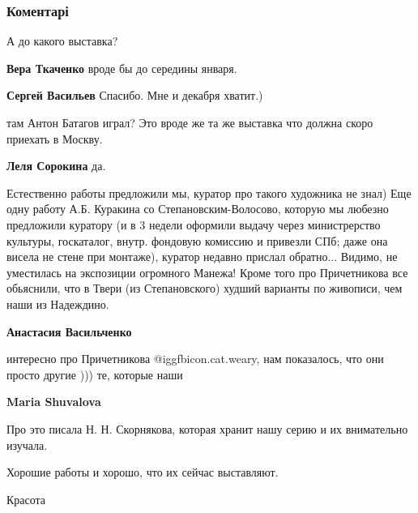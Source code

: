  
 
 
 
 
\subsubsection{Коментарі}
\label{sec:19_11_2021.fb.vasiljev_sergej.moskva.1.vystavka_piter_kurakin_usadjby.cmt}

\begin{itemize} %
А до какого выставка?

\textbf{Вера Ткаченко} вроде бы до середины января.

\textbf{Сергей Васильев} Спасибо. Мне и декабря хватит.)

там Антон Батагов играл? Это вроде же та же выставка что должна скоро приехать в Москву.

\textbf{Леля Сорокина} да.


Естественно работы предложили мы, куратор про такого художника не знал) Еще
одну работу А.Б. Куракина со Степановским-Волосово, которую мы любезно
предложили куратору (и в 3 недели оформили выдачу через министрерство культуры,
госкаталог, внутр. фондовую комиссию и привезли СПб; даже она висела не стене
при монтаже), куратор недавно прислал обратно... Видимо, не уместилась на
экспозиции огромного Манежа! Кроме того про Причетникова все обьяснили, что в
Твери (из Степановского) худший варианты по живописи, чем наши из Надеждино.

\textbf{Анастасия Васильченко} 

интересно про Причетникова  @igg{fbicon.cat.weary}, нам показалось, что они
просто другие ))) те, которые наши

\textbf{Maria Shuvalova} 

Про это писала Н. Н. Скорнякова, которая хранит нашу серию и их внимательно изучала.

Хорошие работы и хорошо, что их сейчас выставляют.

Красота

\end{itemize} %
